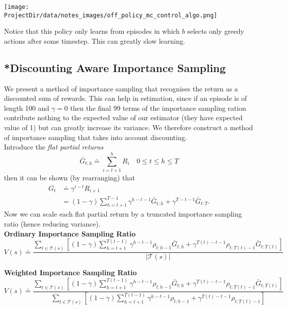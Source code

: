 \texttt{[image: \\ProjectDir/data/notes\_images/off\_policy\_mc\_control\_algo.png]}

Notice that this policy only learns from episodes in which $b$ selects only greedy actions after some timestep. This can greatly slow learning.

\subsection{*Discounting Aware Importance Sampling}
We present a method of importance sampling that recognises the return as a discounted sum of rewards. This can help in estimation, since if an episode is of length 100 and $\gamma = 0$ then the final 99 terms of the importance sampling ration contribute nothing to the expected value of our estimator (they have expected value of 1) but can greatly increase its variance. We therefore construct a method of importance sampling that takes into account discounting.\\

Introduce the \emph{flat partial returns}
\[
    \bar{G}_{t:h} \doteq \sum_{i=t+1}^h R_{i} \quad 0 \leq t \leq h \leq T
\]
then it can be shown (by rearranging) that
\begin{align}
    G_t &\doteq \gamma^{i-t}R_{i+1}\\
        &= (1 - \gamma)\sum_{h=t+1}^{T-1}\gamma^{h-t-1}\bar{G}_{t:h} + \gamma^{T-t-1}\bar{G}_{t:T}.
\end{align}
Now we can scale each flat partial return by a truncated importance sampling ratio (hence reducing variance).\\

{\bfseries{Ordinary Importance Sampling Ratio}}
\begin{equation}
    V(s) \doteq \frac{\sum_{t\in \mathcal{T}(s)} \left[ (1 - \gamma) \sum_{h=t+1}^{T(t-1)} \gamma^{h - t - 1}\rho_{t:h-1}\bar{G}_{t:h} + \gamma^{T(t) - t - 1}\rho_{t:T(t) - 1} \bar{G}_{t:T(t)} \right]}{|\mathcal{T}(s)|}
\end{equation}

{\bfseries{Weighted Importance Sampling Ratio}}
\begin{equation}
    V(s) \doteq \frac{\sum_{t\in \mathcal{T}(s)} \left[ (1 - \gamma) \sum_{h=t+1}^{T(t-1)} \gamma^{h - t - 1}\rho_{t:h-1}\bar{G}_{t:h} + \gamma^{T(t) - t - 1}\rho_{t:T(t) - 1} \bar{G}_{t:T(t)} \right]}{\sum_{t\in \mathcal{T}(s)} \left[ (1 - \gamma) \sum_{h=t+1}^{T(t-1)} \gamma^{h - t - 1}\rho_{t:h-1} + \gamma^{T(t) - t - 1}\rho_{t:T(t) - 1} \right]}
\end{equation}

